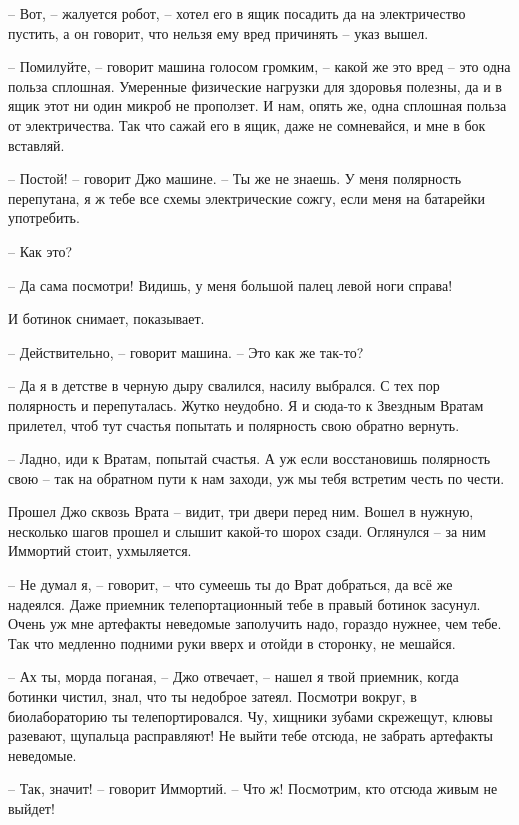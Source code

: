 \documentclass[ebook,oneside,final,openright]{memoir}
\begin{document}
– Вот, – жалуется робот, – хотел его в ящик посадить да на электричество пустить, а он говорит, что нельзя ему вред причинять – указ вышел. \par
– Помилуйте, – говорит машина голосом громким, – какой же это вред – это одна польза сплошная. Умеренные физические нагрузки для здоровья полезны, да и в ящик этот ни один микроб не проползет. И нам, опять же, одна сплошная польза от электричества. Так что сажай его в ящик, даже не сомневайся, и мне в бок вставляй. \par
– Постой! – говорит Джо машине. – Ты же не знаешь. У меня полярность перепутана, я ж тебе все схемы электрические сожгу, если меня на батарейки употребить. \par
– Как это? \par
– Да сама посмотри! Видишь, у меня большой палец левой ноги справа! \par
И ботинок снимает, показывает. \par
– Действительно, – говорит машина. – Это как же так-то? \par
– Да я в детстве в черную дыру свалился, насилу выбрался. С тех пор полярность и перепуталась. Жутко неудобно. Я и сюда-то к Звездным Вратам прилетел, чтоб тут счастья попытать и полярность свою обратно вернуть. \par
– Ладно, иди к Вратам, попытай счастья. А уж если восстановишь полярность свою – так на обратном пути к нам заходи, уж мы тебя встретим честь по чести.\par
\par
Прошел Джо сквозь Врата – видит, три двери перед ним. Вошел в нужную, несколько шагов прошел и слышит какой-то шорох сзади. Оглянулся – за ним Иммортий стоит, ухмыляется. \par
\par
– Не думал я, – говорит, – что сумеешь ты до Врат добраться, да всё же надеялся. Даже приемник телепортационный тебе в правый ботинок засунул. Очень уж мне артефакты неведомые заполучить надо, гораздо нужнее, чем тебе. Так что медленно подними руки вверх и отойди в сторонку, не мешайся.\par
– Ах ты, морда поганая, – Джо отвечает, – нашел я твой приемник, когда ботинки чистил, знал, что ты недоброе затеял. Посмотри вокруг, в биолабораторию ты телепортировался. Чу, хищники зубами скрежещут, клювы разевают, щупальца расправляют! Не выйти тебе отсюда, не забрать артефакты неведомые.\par
– Так, значит! – говорит Иммортий. – Что ж! Посмотрим, кто отсюда живым не выйдет!\par
\end{document}
